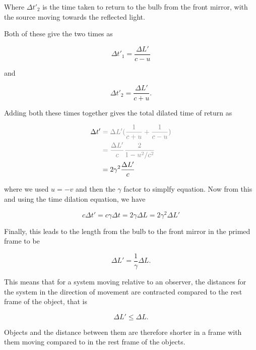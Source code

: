 Where ${\Delta t'_2}$ is the time taken to return to the bulb from the front mirror, with the source moving towards the reflected light.

Both of these give the two times as

\begin{equation}
	{\Delta t'_1} = \frac{\Delta  L'}{{c} - {u}}
\end{equation}

and

\begin{equation}
	{\Delta t'_2} = \frac{{\Delta  L'}}{{c} + {u}}.
\end{equation}

Adding both these times together gives the total dilated time of return as

\begin{equation}
	\begin{aligned}
		{\Delta t{'}} & \color{gray} = {\Delta  L'}(\frac{1}{{c} + {u}} + \frac{1}{{c} - {u}}) \\
		              & \color{gray} = \frac{\Delta  L'}{c}\frac{2}{1- {u}^2/{c}^2}            \\
		              & =  2{\gamma}^2 \frac{\Delta  L'}{c}
	\end{aligned}
\end{equation}

where we used ${u}=-{v}$ and then the ${\gamma}$ factor to simplfy equation.
Now from this and using the time dilation equation, we have

\begin{equation}
	{c}{\Delta t{'}} = {c}{\gamma} {\Delta t} = 2{\gamma} {\Delta L} = 2{\gamma}^2 {\Delta  L'}
\end{equation}

Finally, this leads to the length from the bulb to the front mirror in the primed frame to be

\begin{equation}
	{\Delta  L'} = \frac{1}{{\gamma}}{\Delta  L}.
\end{equation}

This means that for a system moving relative to an observer, the distances for the system in the direction of movement are contracted compared to the rest frame of the object, that is

\begin{equation}
	{\Delta  L'} \leq {\Delta  L}.
\end{equation}

Objects and the distance between them are therefore shorter in a frame with them moving compared to in the rest frame of the objects.

